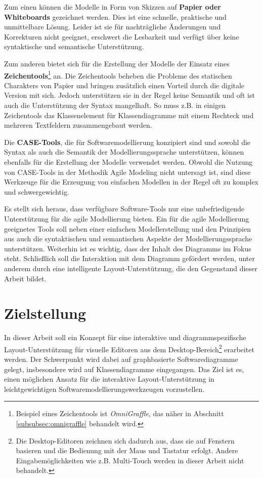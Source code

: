 Zum einen können die Modelle in Form von Skizzen auf \textbf{Papier oder Whiteboards} gezeichnet werden. Dies ist eine schnelle, praktische und unmittelbare Lösung. Leider ist sie für nachträgliche Änderungen und Korrekturen nicht geeignet, erschwert die Lesbarkeit und verfügt über keine syntaktische und semantische Unterstützung.

Zum anderen bietet sich für die Erstellung der Modelle der Einsatz eines \textbf{Zeichentools}\footnote{Beispiel eines Zeichentools ist \textit{OmniGraffle}, das näher in Abschnitt \ref{subsubsec:omnigraffle} behandelt wird.} an. Die Zeichentools beheben die Probleme des statischen Charakters von Papier und bringen zusätzlich einen Vorteil durch die digitale Version mit sich. Jedoch unterstützen sie in der Regel keine Semantik und oft ist auch die Unterstützung der Syntax mangelhaft. So muss z.B. in einigen Zeichentools das Klassenelement für Klassendiagramme mit einem Rechteck und mehreren Textfeldern zusammengebaut werden.

Die \textbf{CASE-Tools}, die für Softwaremodellierung konzipiert sind und sowohl die Syntax als auch die Semantik der Modellierungssprache unterstützen, können ebenfalls für die Erstellung der Modelle verwendet werden. Obwohl die Nutzung von CASE-Tools in der Methodik Agile Modeling nicht untersagt ist, sind diese Werkzeuge für die Erzeugung von einfachen Modellen in der Regel oft zu komplex und schwergewichtig.

Es stellt sich heraus, dass verfügbare Software-Tools nur eine unbefriedigende Unterstützung für die agile Modellierung bieten. Ein für die agile Modellierung geeignetes Tools soll neben einer einfachen Modellerstellung und den Prinzipien aus \cite{Ambler02Agile} auch die syntaktischen und semantischen Aspekte der Modellierungssprache unterstützen. Weiterhin ist es wichtig, dass der Inhalt des Diagramms im Fokus steht. Schließlich soll die Interaktion mit dem Diagramm gefördert werden, unter anderem durch eine intelligente Layout-Unterstützung, die den Gegenstand dieser Arbeit bildet.

\section{Zielstellung}

In dieser Arbeit soll ein Konzept für eine interaktive und diagrammspezifische Layout-Un\-ter\-stüt\-zung für visuelle Editoren aus dem Desktop-Bereich\footnote{Die Desktop-Editoren zeichnen sich dadurch aus, dass sie auf Fenstern basieren und die Bedienung mit der Maus und Tastatur erfolgt. Andere Eingabemöglichkeiten wie z.B. Multi-Touch werden in dieser Arbeit nicht behandelt.} erarbeitet werden. Der Schwerpunkt wird dabei auf graphbasierte Softwarediagramme gelegt, insbesondere wird auf Klassendiagramme eingegangen. Das Ziel ist es, einen möglichen Ansatz für die interaktive Layout-Unterstützung in leichtgewichtigen Softwaremodellierungswerkzeugen vorzustellen.

